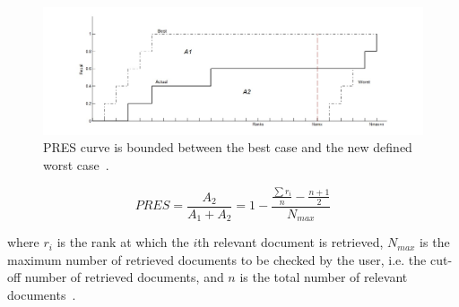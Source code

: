 \begin{figure}[htpb]
   \centering
   \includegraphics[scale=.5]{figs/pres.jpg}
   \caption{PRES curve is bounded between the best case and the new defined worst case~\citep{magdy2010pres}.}  
   \label{fig:pres} 
\end{figure}
\FloatBarrier 
\begin{equation}
\label{eq:pres}
PRES=\frac{A_{2}}{A_{1}+A_{2}}=1-\frac{\frac{\sum r_{i}}{n}-\frac{n+1}{2}}{N_{max}}
\end{equation}

where $ r_{i} $ is the rank at which the $ i $th relevant document is retrieved, $ N_{max} $ is the maximum number of retrieved documents to be checked by the user, i.e. the cut-off number of retrieved documents, and $ n $ is the total number of relevant documents~\citep{magdy2010pres}.